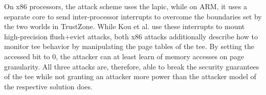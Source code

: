 On x86 processors, the attack scheme uses the \gls{lapic}, while on ARM, it uses
a separate core to send inter-processor interrupts to overcome the boundaries
set by the two worlds in TrustZone. While Kou et al. use these interrupts to
mount high-precision flush+evict attacks, both x86 attacks additionally describe
how to monitor \gls{tee} behavior by manipulating the page tables of the
\gls{tee}. By setting the accessed bit to 0, the attacker can at least learn of
memory accesses on page granularity. All three attacks are, therefore, able to
break the security guarantees of the \gls{tee} while not granting an attacker
more power than the attacker model of the respective solution does.
